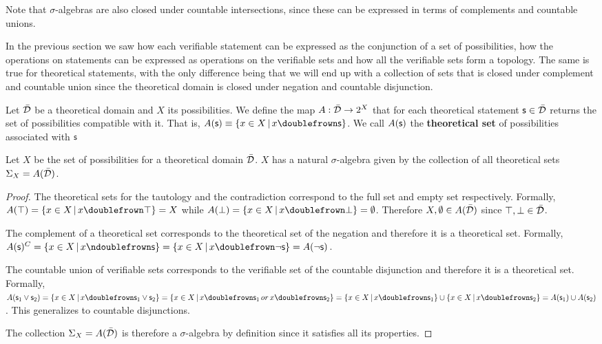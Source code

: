 \documentclass[11pt,letterpaper,fleqn]{memoir} %
\begin{document}
Note that $\sigma$-algebras are also closed under countable intersections, since these can be expressed in terms of complements and countable unions.

In the previous section we saw how each verifiable statement can be expressed as the conjunction of a set of possibilities, how the operations on statements can be expressed as operations on the verifiable sets and how all the verifiable sets form a topology. The same is true for theoretical statements, with the only difference being that we will end up with a collection of sets that is closed under complement and countable union since the theoretical domain is closed under negation and countable disjunction.

\begin{mathSection}
	
	\begin{defn}
		Let $\bar{\mathcal{D}}$ be a theoretical domain and $X$ its possibilities. We define the map $A : \bar{\mathcal{D}} \rightarrow 2^X$ that for each theoretical statement $\mathsf{s} \in \bar{\mathcal{D}}$ returns the set of possibilities compatible with it. That is, $A(\stmt)\equiv\{ x \in X \, | \, x \comp \stmt\}$. We call $A(\mathsf{s})$ the \textbf{theoretical set} of possibilities associated with $\mathsf{s}$
	\end{defn}
	
	\begin{prop}
		Let $X$ be the set of possibilities for a theoretical domain $\bar{\mathcal{D}}$. $X$ has a natural $\sigma$-algebra given by the collection of all theoretical sets $\Sigma_X=A(\bar{\mathcal{D}})$.
	\end{prop}
	
	\begin{proof}
	The theoretical sets for the tautology and the contradiction correspond to the full set and empty set respectively. Formally, $A(\tautology) = \{ x \in X \, | \, x \comp \tautology\} = X$ while $A(\contradiction) = \{ x \in X \, | \, x \comp \contradiction\} = \emptyset$. Therefore $X, \emptyset \in A(\bar{\mathcal{D}})$ since $\top, \bot \in \bar{\mathcal{D}}$.

	The complement of a theoretical set corresponds to the theoretical set of the negation and therefore it is a theoretical set. Formally, $A(\stmt)^C = \{ x \in X \, | \, x \ncomp \stmt\} =  \{ x \in X \, | \, x \comp \NOT\stmt\} = A(\NOT\stmt)$.

	The countable union of verifiable sets corresponds to the verifiable set of the countable disjunction and therefore it is a theoretical set. Formally, $A(\stmt_1\OR\stmt_2) = \{ x \in X \, | \, x \comp \stmt_1\OR\stmt_2\} =  \{ x \in X \, | \, x \comp \stmt_1 \, or \, x \comp \stmt_2\} = \{ x \in X \, | \, x \comp \stmt_1\} \cup \{ x \in X \, | \, x \comp \stmt_2\} = A(\stmt_1) \cup A(\stmt_2)$. This generalizes to countable disjunctions.

	The collection $\Sigma_X=A(\bar{\mathcal{D}})$ is therefore a $\sigma$-algebra by definition since it satisfies all its properties.
	\end{proof}
\end{mathSection}
\end{document}
